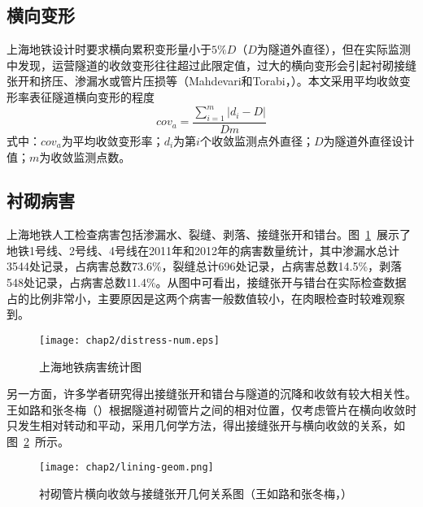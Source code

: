 \subsection{横向变形}

上海地铁设计时要求横向累积变形量小于$5\%D$（$D$为隧道外直径），但在实际监测中发现，运营隧道的收敛变形往往超过此限定值，过大的横向变形会引起衬砌接缝张开和挤压、渗漏水或管片压损等（Mahdevari和Torabi，\citeyear{mahdevari2012prediction}）。本文采用平均收敛变形率表征隧道横向变形的程度
\begin{equation}
    \label{equ:conv_ave}
    {{cov}_{a}}=\frac{\sum\limits_{i=1}^{m}{\left| {{d}_{i}}-D \right|}}{Dm}
\end{equation}
式中：${cov}_{a}$为平均收敛变形率；${d}_{i}$为第$i$个收敛监测点外直径；$D$为隧道外直径设计值；$m$为收敛监测点数。

\subsection{衬砌病害}

上海地铁人工检查病害包括渗漏水、裂缝、剥落、接缝张开和错台。图~\ref{fig:上海地铁病害统计图}~展示了地铁1号线、2号线、4号线在2011年和2012年的病害数量统计，其中渗漏水总计3544处记录，占病害总数73.6\%，裂缝总计696处记录，占病害总数14.5\%，剥落548处记录，占病害总数11.4\%。从图中可看出，接缝张开与错台在实际检查数据占的比例非常小，主要原因是这两个病害一般数值较小，在肉眼检查时较难观察到。

\begin{figure}[htbp]
    \centering
    \texttt{[image: chap2/distress-num.eps]}
    \caption{上海地铁病害统计图}
    \label{fig:上海地铁病害统计图}
\end{figure}

另一方面，许多学者研究得出接缝张开和错台与隧道的沉降和收敛有较大相关性。王如路和张冬梅（\citeyear{王如路2013超载作用下软土盾构隧道横向变形机理及控制指标研究}）根据隧道衬砌管片之间的相对位置，仅考虑管片在横向收敛时只发生相对转动和平动，采用几何学方法，得出接缝张开与横向收敛的关系，如图~\ref{fig:衬砌管片横向收敛与接缝张开几何关系图}~所示。

\begin{figure}[htbp]
    \centering
    \texttt{[image: chap2/lining-geom.png]}
    \caption{衬砌管片横向收敛与接缝张开几何关系图（王如路和张冬梅，\citeyear{王如路2013超载作用下软土盾构隧道横向变形机理及控制指标研究}）}
    \label{fig:衬砌管片横向收敛与接缝张开几何关系图}
\end{figure}

